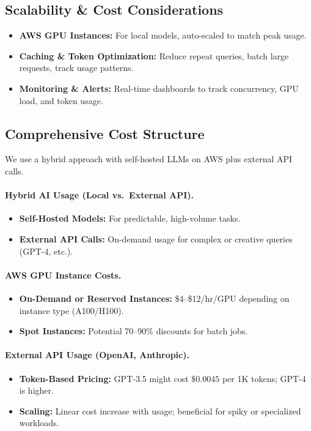 \documentclass[11pt]{article}
\begin{document}
\subsection{Scalability \& Cost Considerations}
\begin{itemize}
    \item \textbf{AWS GPU Instances:} For local models, auto-scaled to match peak usage.
    \item \textbf{Caching \& Token Optimization:} Reduce repeat queries, batch large requests, track usage patterns.
    \item \textbf{Monitoring \& Alerts:} Real-time dashboards to track concurrency, GPU load, and token usage.
\end{itemize}

\subsection{Comprehensive Cost Structure}
We use a hybrid approach with self-hosted LLMs on AWS plus external API calls.

\paragraph{Hybrid AI Usage (Local vs.\ External API).}
\begin{itemize}
    \item \textbf{Self-Hosted Models:} For predictable, high-volume tasks.
    \item \textbf{External API Calls:} On-demand usage for complex or creative queries (GPT-4, etc.).
\end{itemize}

\paragraph{AWS GPU Instance Costs.}
\begin{itemize}
    \item \textbf{On-Demand or Reserved Instances:} \$4--\$12/hr/GPU depending on instance type (A100/H100).
    \item \textbf{Spot Instances:} Potential 70--90\% discounts for batch jobs.
\end{itemize}

\paragraph{External API Usage (OpenAI, Anthropic).}
\begin{itemize}
    \item \textbf{Token-Based Pricing:} GPT-3.5 might cost \(\$0.0045\) per 1K tokens; GPT-4 is higher.
    \item \textbf{Scaling:} Linear cost increase with usage; beneficial for spiky or specialized workloads.
\end{itemize}
\end{document}
